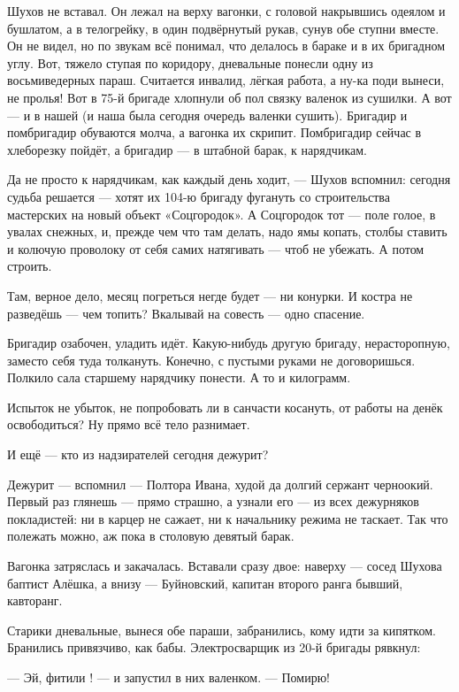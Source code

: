 Шухов не вставал. Он лежал на верху вагонки, с головой накрывшись одеялом и бушлатом, а в 
телогрейку, в один подвёрнутый рукав, сунув обе ступни вместе. Он не видел, но по звукам всё 
понимал, что делалось в бараке и в их бригадном углу. Вот, тяжело ступая по коридору, 
дневальные понесли одну из восьмиведерных параш. Считается инвалид, лёгкая работа, а ну-ка 
поди вынеси, не пролья! Вот в 75-й бригаде хлопнули об пол связку валенок из сушилки. А вот --- и 
в нашей (и наша была сегодня очередь валенки сушить). Бригадир и помбригадир обуваются молча, 
а вагонка их скрипит. Помбригадир сейчас в хлеборезку пойдёт, а бригадир --- в штабной барак, к 
нарядчикам.

Да не просто к нарядчикам, как каждый день ходит, --- Шухов вспомнил: сегодня судьба решается 
--- хотят их 104-ю бригаду фугануть со строительства мастерских на новый объект «Соцгородок». А 
Соцгородок тот --- поле голое, в увалах снежных, и, прежде чем что там делать, надо ямы копать, 
столбы ставить и колючую проволоку от себя самих натягивать --- чтоб не убежать. А потом 
строить.

Там, верное дело, месяц погреться негде будет --- ни конурки. И костра не разведёшь --- чем 
топить? Вкалывай на совесть --- одно спасение.

Бригадир озабочен, уладить идёт. Какую-нибудь другую бригаду, нерасторопную, заместо себя 
туда толкануть. Конечно, с пустыми руками не договоришься. Полкило сала старшему нарядчику 
понести. А то и килограмм.

Испыток не убыток, не попробовать ли в санчасти косануть, от работы на денёк освободиться? Ну 
прямо всё тело разнимает.

И ещё --- кто из надзирателей сегодня дежурит?

Дежурит --- вспомнил --- Полтора Ивана, худой да долгий сержант черноокий. Первый раз глянешь --- 
прямо страшно, а узнали его --- из всех дежурняков покладистей: ни в карцер не сажает, ни к 
начальнику режима не таскает. Так что полежать можно, аж пока в столовую девятый барак.

Вагонка затряслась и закачалась. Вставали сразу двое: наверху --- сосед Шухова баптист 
Алёшка, а внизу --- Буйновский, капитан второго ранга бывший, кавторанг.

Старики дневальные, вынеся обе параши, забранились, кому идти за кипятком. Бранились 
привязчиво, как бабы. Электросварщик из 20-й бригады рявкнул:

--- Эй, фитили ! --- и запустил в них валенком. --- Помирю!

